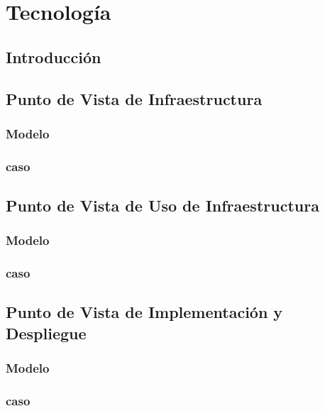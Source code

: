 \chapter{Tecnología}

\section{Introducción}

\section{Punto de Vista de Infraestructura}

\subsection{Modelo}

\newpage

\subsection{caso}

\newpage

\section{Punto de Vista de Uso de Infraestructura}

\subsection{Modelo}

\newpage

\subsection{caso}

\newpage

\section{Punto de Vista de Implementación y Despliegue}

\subsection{Modelo}

\newpage

\subsection{caso}

